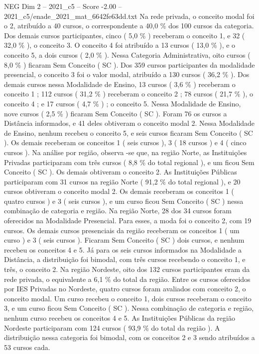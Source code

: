 \begin{textsample}{NEG Dim 2 – 2021\_c5 – Score -2.00 – 2021\_c5/enade\_2021\_mat\_6642fe63dd.txt}
Na rede privada, o conceito modal foi o 2, atribuído a 40 cursos, o correspondente a 40,0 \% dos 100 cursos da categoria.
Dos demais cursos participantes, cinco ( 5,0 \% ) receberam o conceito 1, e 32 ( 32,0 \% ), o conceito 3.
O conceito 4 foi atribuído a 13 cursos ( 13,0 \% ), e o conceito 5, a dois cursos ( 2,0 \% ).
Nessa Categoria Administrativa, oito cursos ( 8,0 \% ) ficaram Sem Conceito ( SC ).
Dos 359 cursos participantes da modalidade presencial, o conceito 3 foi o valor modal, atribuído a 130 cursos ( 36,2 \% ).
Dos demais cursos nessa Modalidade de Ensino, 13 cursos ( 3,6 \% ) receberam o conceito 1 ; 112 cursos ( 31,2 \% ) receberam o conceito 2 ; 78 cursos ( 21,7 \% ), o conceito 4 ; e 17 cursos ( 4,7 \% ) ; o conceito 5.
Nessa Modalidade de Ensino, nove cursos ( 2,5 \% ) ficaram Sem Conceito ( SC ).
Foram 76 os cursos a Distância informados, e 41 deles obtiveram o conceito modal 2.
Nessa Modalidade de Ensino, nenhum recebeu o conceito 5, e seis cursos ficaram Sem Conceito ( SC ).
Os demais receberam os conceitos 1 ( seis cursos ), 3 ( 18 cursos ) e 4 ( cinco cursos ).
Na análise por região, observa -se que, na região Norte, as Instituições Privadas participaram com três cursos ( 8,8 \% do total regional ), e um ficou Sem Conceito ( SC ).
Os demais obtiveram o conceito 2.
As Instituições Públicas participaram com 31 cursos na região Norte ( 91,2 \% do total regional ), e 20 cursos obtiveram o conceito modal 2.
Os demais receberam os conceitos 1 ( quatro cursos ) e 3 ( seis cursos ), e um curso ficou Sem Conceito ( SC ) nessa combinação de categoria e região.
Na região Norte, 28 dos 34 cursos foram oferecidos na Modalidade Presencial.
Para esses, a moda foi o conceito 2, com 19 cursos.
Os demais cursos presenciais da região receberam os conceitos 1 ( um curso ) e 3 ( seis cursos ).
Ficaram Sem Conceito ( SC ) dois cursos, e nenhum recebeu os conceitos 4 e 5.
Já para os seis cursos informados na Modalidade a Distância, a distribuição foi bimodal, com três cursos recebendo o conceito 1, e três, o conceito 2.
Na região Nordeste, oito dos 132 cursos participantes eram da rede privada, o equivalente a 6,1 \% do total da região.
Entre os cursos oferecidos por IES Privadas no Nordeste, quatro cursos foram avaliados com conceito 2, o conceito modal.
Um curso recebeu o conceito 1, dois cursos receberam o conceito 3, e um curso ficou Sem Conceito ( SC ).
Nessa combinação de categoria e região, nenhum curso recebeu os conceitos 4 e 5.
As Instituições Públicas da região Nordeste participaram com 124 cursos ( 93,9 \% do total da região ).
A distribuição nessa categoria foi bimodal, com os conceitos 2 e 3 sendo atribuídos a 53 cursos cada.

\end{textsample}
